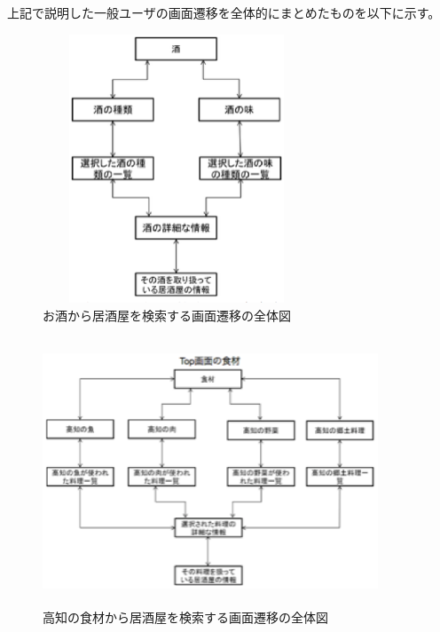 \documentclass[a4j,titlepage]{jarticle}
\begin{document}
\clearpage
上記で説明した一般ユーザの画面遷移を全体的にまとめたものを以下に示す。



\begin {figure}[!htbp]
    \begin{center}
    \includegraphics [height=8cm, width=8cm]{19.eps}
    \caption {お酒から居酒屋を検索する画面遷移の全体図}
    \label {fig:19}
    \end{center}
\end {figure}



\begin {figure}[!htbp]
    \begin{center}
    \includegraphics [height=8cm, width=10cm]{20.eps}
    \caption {高知の食材から居酒屋を検索する画面遷移の全体図}
    \label {fig:20}
    \end{center}
\end {figure}
\end{document}
